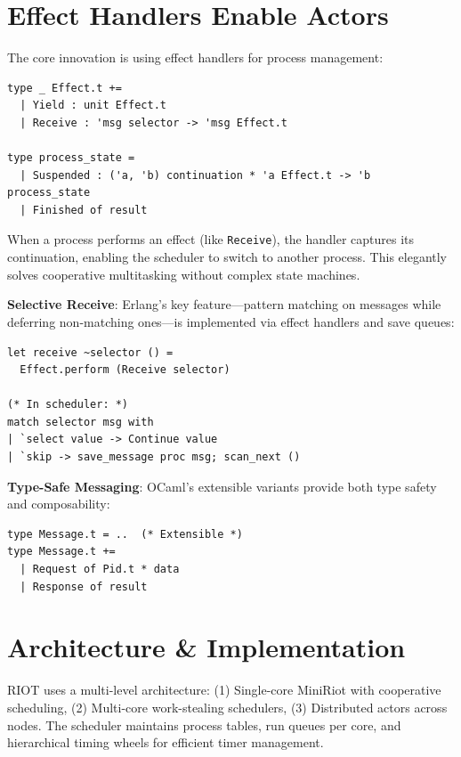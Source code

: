 \documentclass[sigplan,screen,nonacm]{acmart}
\begin{document}
\section{Effect Handlers Enable Actors}

The core innovation is using effect handlers for process management:

\begin{lstlisting}
type _ Effect.t += 
  | Yield : unit Effect.t
  | Receive : 'msg selector -> 'msg Effect.t

type process_state =
  | Suspended : ('a, 'b) continuation * 'a Effect.t -> 'b process_state
  | Finished of result
\end{lstlisting}

When a process performs an effect (like \texttt{Receive}), the handler captures its continuation, enabling the scheduler to switch to another process. This elegantly solves cooperative multitasking without complex state machines.

\textbf{Selective Receive}: Erlang's key feature—pattern matching on messages while deferring non-matching ones—is implemented via effect handlers and save queues:

\begin{lstlisting}
let receive ~selector () =
  Effect.perform (Receive selector)

(* In scheduler: *)
match selector msg with
| `select value -> Continue value
| `skip -> save_message proc msg; scan_next ()
\end{lstlisting}

\textbf{Type-Safe Messaging}: OCaml's extensible variants provide both type safety and composability:

\begin{lstlisting}
type Message.t = ..  (* Extensible *)
type Message.t += 
  | Request of Pid.t * data
  | Response of result
\end{lstlisting}

\section{Architecture \& Implementation}

RIOT uses a multi-level architecture: (1) Single-core MiniRiot with cooperative scheduling, (2) Multi-core work-stealing schedulers, (3) Distributed actors across nodes. The scheduler maintains process tables, run queues per core, and hierarchical timing wheels for efficient timer management.
\end{document}

